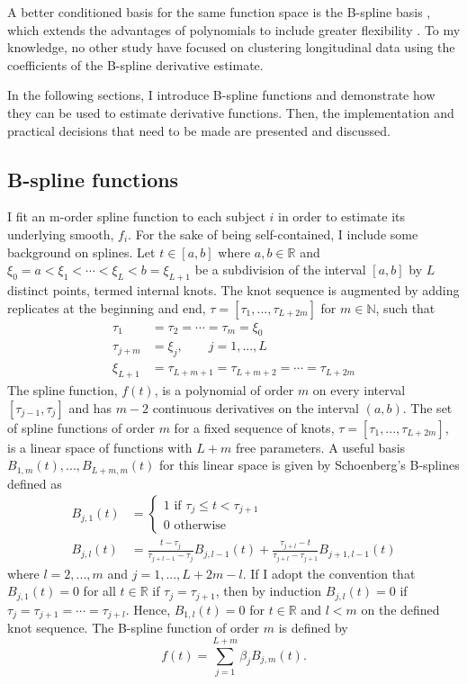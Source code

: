 A better conditioned basis for the same function space is the B-spline basis \cite{deboor1978, schumaker1981,curry1966, de1976}, which extends the advantages of polynomials to include greater flexibility \cite{abraham2003}. To my knowledge, no other study have focused on clustering longitudinal data using the coefficients of the B-spline derivative estimate.

In the following sections, I introduce B-spline functions and demonstrate how they can be used to estimate derivative functions. Then, the implementation and practical decisions that need to be made are presented and discussed.

\subsection{B-spline functions}\label{sec:bsplines}
I fit an m-order spline function to each subject $i$ in order to estimate its underlying smooth, $f_i$. For the sake of being self-contained, I include some background on splines. Let $t\in[a,b]$ where $a,b\in\mathbb{R}$ and $\xi_0=a<\xi_{1}<\cdots<\xi_{L} < b = \xi_{L+1}$ be a subdivision of  the interval $[a,b]$ by $L$ distinct points, termed internal knots. The knot sequence is augmented by adding replicates at the beginning and end, $\tau=[\tau_{1},...,\tau_{L+2m}]$ for $m\in\mathbb{N}$, such that 
\begin{align*}
\tau_{1}&=\tau_{2}=\cdots =\tau_{m} =\xi_{0}\\
\tau_{j+m}& = \xi_{j}, \quad\quad j=1,...,L\\
\xi_{L+1}&=\tau_{L+m+1}=\tau_{L+m+2}=\cdots =\tau_{L+2m} 
\end{align*}
The spline function, $f(t)$, is a polynomial of order $m$ on every interval $[\tau_{j-1},\tau_{j}]$ and has $m-2$ continuous derivatives on the interval $(a,b)$. The set of spline functions of order $m$ for a fixed sequence of knots, $\tau = [\tau_1,...,\tau_{L+2m}]$, is a linear space of functions with $L+m$ free parameters. A useful basis $B_{1,m}(t),...,B_{L+m,m}(t)$ for this linear space is given by Schoenberg's B-splines \cite{curry1966, de1976} defined as
\begin{align*}
B_{j,1}(t) &= \begin{cases}
1 \text{ if }\tau_j\leq t < \tau_{j+1}\\
0\text{ otherwise}
\end{cases}\\
B_{j,l}(t) &= \frac{t-\tau_j}{\tau_{j+l-1}-\tau_j} B_{j,l-1}(t)+\frac{\tau_{j+l}-t}{\tau_{j+l}-\tau_{j+1}} B_{j+1,l-1}(t)
\end{align*}
where $l=2,...,m$ and $j=1,...,L+2m-l$.  If I adopt the convention that $B_{j,1}(t)=0$ for all $t\in\mathbb{R}$ if $\tau_{j}=\tau_{j+1}$, then by induction $B_{j,l}(t)=0$ if $\tau_{j}=\tau_{j+1}=\cdots=\tau_{j+l}$. Hence, $B_{1,l}(t)=0$ for $t\in\mathbb{R}$ and $l<m$ on the defined knot sequence. The B-spline function of order $m$ is defined by
$$f(t) = \sum^{L+m}_{j=1} \beta_j B_{j,m}(t).$$


